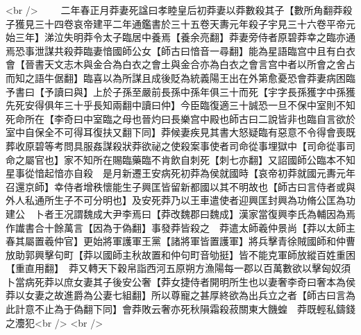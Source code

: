 <br />
　　二年春正月莽妻死諡曰孝睦皇后初莽妻以莽數殺其子【數所角翻莽殺子獲見三十四卷哀帝建平二年通鑑書於三十五卷天夀元年殺子宇見三十六卷平帝元始三年】涕泣失明莽令太子臨居中養焉【養余亮翻】莽妻旁侍者原碧莽幸之臨亦通焉恐事泄謀共殺莽臨妻愔國師公女【師古曰愔音一尋翻】能為星語臨宫中且有白衣會【晉書天文志木與金合為白衣之會土與金合亦為白衣之會言宫中者以所會之舍占而知之語牛倨翻】臨喜以為所謀且成後貶為統義陽王出在外第愈憂恐會莽妻病困臨予書曰【予讀曰與】上於子孫至嚴前長孫中孫年俱三十而死【宇字長孫獲字中孫獲先死安得俱年三十乎長知兩翻中讀曰仲】今臣臨復適三十誠恐一旦不保中室則不知死命所在【李奇曰中室臨之母也晉灼曰長樂宫中殿也師古曰二說皆非也臨自言欲於室中自保全不可得耳復扶又翻下同】莽候妻疾見其書大怒疑臨有惡意不令得會喪既葬收原碧等考問具服姦謀殺狀莽欲祕之使殺案事使者司命從事埋獄中【司命從事司命之屬官也】家不知所在賜臨藥臨不肯飲自刺死【刺七亦翻】又詔國師公臨本不知星事從愔起愔亦自殺　是月新遷王安病死初莽為侯就國時【哀帝初莽就國元夀元年召還京師】幸侍者增秩懷能生子興匡皆留新都國以其不明故也【師古曰言侍者或與外人私通所生子不可分明也】及安死莽乃以王車遣使者迎興匡封興為功脩公匡為功建公　卜者王况謂魏成大尹李焉曰【莽改魏郡曰魏成】漢家當復興李氏為輔因為焉作䜟書合十餘萬言【因為于偽翻】事發莽皆殺之　莽遣太師羲仲景尚【莽以太師主春其屬置羲仲官】更始將軍護軍王黨【諸將軍皆置護軍】將兵擊青徐賊國師和仲曹放助郭興擊句町【莽以國師主秋故置和仲句町音劬挺】皆不能克軍師放縱百姓重困【重直用翻】　莽又轉天下穀帛詣西河五原朔方漁陽每一郡以百萬數欲以擊匈奴須卜當病死莽以庶女妻其子後安公奢【莽女捷侍者開明所生也以妻奢李奇曰奢本為侯莽以女妻之故進爵為公妻七組翻】所以尊寵之甚厚終欲為出兵立之者【師古曰言為此計意不止為于偽翻下同】會莽敗云奢亦死秋隕霜殺菽關東大饑蝗　莽既輕私鑄錢之灋犯<br />
<br />
